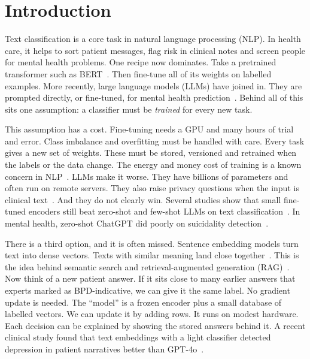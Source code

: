 \documentclass[11pt]{article}
\begin{document}
\section{Introduction}\label{sec:intro}

Text classification is a core task in natural language processing (NLP). In health care, it helps
to sort patient messages, flag risk in clinical notes and screen people for mental health problems.
One recipe now dominates. Take a pretrained transformer such as BERT~\cite{devlin2019bert}. Then
fine-tune all of its weights on labelled examples. More recently, large language models (LLMs) have
joined in. They are prompted directly, or fine-tuned, for mental health
prediction~\cite{yang2024mentallama,xu2024mental,guo2024llmreview}. Behind all of this sits one
assumption: a classifier must be \emph{trained} for every new task.

This assumption has a cost. Fine-tuning needs a GPU and many hours of trial and error. Class
imbalance and overfitting must be handled with care. Every task gives a new set of weights. These
must be stored, versioned and retrained when the labels or the data change. The energy and money
cost of training is a known concern in NLP~\cite{strubell2019energy,schwartz2020green}. LLMs make
it worse. They have billions of parameters and often run on remote servers. They also raise privacy
questions when the input is clinical text~\cite{guo2024llmreview}. And they do not clearly win.
Several studies show that small fine-tuned encoders still beat zero-shot and few-shot LLMs on text
classification~\cite{bucher2024finetuned,edwards2024icl}. In mental health, zero-shot ChatGPT did
poorly on suicidality detection~\cite{lamichhane2023chatgpt}.

There is a third option, and it is often missed. Sentence embedding models turn text into dense
vectors. Texts with similar meaning land close together~\cite{reimers2019sbert,xiao2023cpack,muennighoff2023mteb}.
This is the idea behind semantic search and retrieval-augmented generation
(RAG)~\cite{karpukhin2020dpr,lewis2020rag}. Now think of a new patient answer. If it sits close to
many earlier answers that experts marked as BPD-indicative, we can give it the same label. No
gradient update is needed. The ``model'' is a frozen encoder plus a small database of labelled
vectors. We can update it by adding rows. It runs on modest hardware. Each decision can be explained
by showing the stored answers behind it. A recent clinical study found that text embeddings with a
light classifier detected depression in patient narratives better than GPT-4o~\cite{lho2025jama}.
\end{document}
